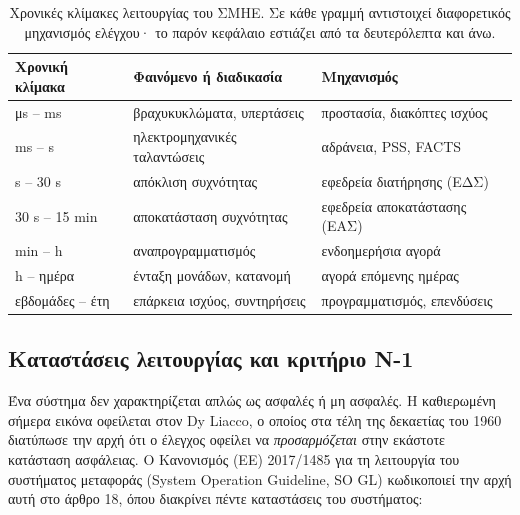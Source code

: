 \begin{table}[!htbp]
\centering
\begin{tabular}{lll}
\hline
Χρονική κλίμακα & Φαινόμενο ή διαδικασία & Μηχανισμός \\
\hline
μs -- ms   & βραχυκυκλώματα, υπερτάσεις   & προστασία, διακόπτες ισχύος \\
ms -- s    & ηλεκτρομηχανικές ταλαντώσεις & αδράνεια, PSS, FACTS \\
s -- 30 s  & απόκλιση συχνότητας          & εφεδρεία διατήρησης (ΕΔΣ) \\
30 s -- 15 min & αποκατάσταση συχνότητας  & εφεδρεία αποκατάστασης (ΕΑΣ) \\
min -- h   & αναπρογραμματισμός           & ενδοημερήσια αγορά \\
h -- ημέρα & ένταξη μονάδων, κατανομή     & αγορά επόμενης ημέρας \\
εβδομάδες -- έτη & επάρκεια ισχύος, συντηρήσεις & προγραμματισμός, επενδύσεις \\
\hline
\end{tabular}
\caption{Χρονικές κλίμακες λειτουργίας του ΣΜΗΕ. Σε κάθε γραμμή αντιστοιχεί διαφορετικός
μηχανισμός ελέγχου· το παρόν κεφάλαιο εστιάζει από τα δευτερόλεπτα και άνω.}
\label{tab:chronikes-klimakes}
\end{table}

\subsection{Καταστάσεις λειτουργίας και κριτήριο N-1}

Ένα σύστημα δεν χαρακτηρίζεται απλώς ως ασφαλές ή μη ασφαλές. Η καθιερωμένη σήμερα εικόνα
οφείλεται στον Dy Liacco, ο οποίος στα τέλη της δεκαετίας του 1960 διατύπωσε την αρχή ότι
ο έλεγχος οφείλει να \emph{προσαρμόζεται} στην εκάστοτε κατάσταση ασφάλειας. Ο Κανονισμός (ΕΕ) 2017/1485 για τη λειτουργία του
συστήματος μεταφοράς (System Operation Guideline, SO GL) κωδικοποιεί την αρχή αυτή στο
άρθρο 18, όπου διακρίνει πέντε καταστάσεις του συστήματος:

